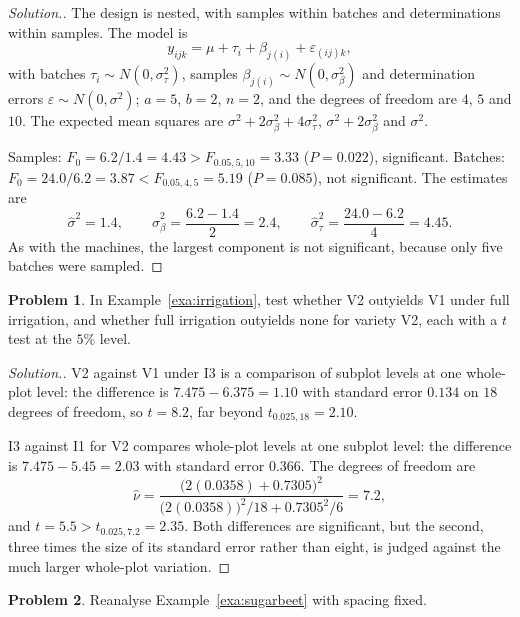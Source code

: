 \documentclass[11pt,a4paper]{article}
\numberwithin{equation}{section}
\theoremstyle{definition}
\newtheorem{problemx}{Problem}[subsection]
\newenvironment{problem}{\begin{problemx}}{\end{problemx}}
\newenvironment{solution}
  {\renewcommand{\qedsymbol}{}\begin{proof}[\textit{Solution}.]}
  {\end{proof}}
\begin{document}
\begin{solution}
The design is nested, with samples within batches and determinations within samples. The model is
\[
y_{ijk} = \mu + \tau_i + \beta_{j(i)} + \varepsilon_{(ij)k} ,
\]
with batches $\tau_i \sim N(0, \sigma^2_\tau)$, samples $\beta_{j(i)} \sim N(0, \sigma^2_\beta)$ and determination errors $\varepsilon \sim N(0, \sigma^2)$;
$a = 5$, $b = 2$, $n = 2$, and the degrees of freedom are $4$, $5$ and $10$. The expected mean squares are $\sigma^2 + 2\sigma^2_\beta + 4\sigma^2_\tau$, $\sigma^2 + 2\sigma^2_\beta$ and $\sigma^2$.

Samples: $F_0 = 6.2/1.4 = 4.43 > F_{0.05, 5, 10} = 3.33$ ($P = 0.022$), significant. Batches: $F_0 = 24.0/6.2 = 3.87 < F_{0.05, 4, 5} = 5.19$ ($P = 0.085$), not significant. The estimates are
\[
\hat\sigma^2 = 1.4 , \qquad \hat\sigma^2_\beta = \frac{6.2 - 1.4}2 = 2.4 , \qquad \hat\sigma^2_\tau = \frac{24.0 - 6.2}4 = 4.45 .
\]
As with the machines, the largest component is not significant, because only five batches were sampled.
\end{solution}

\begin{problem}
In Example~\ref{exa:irrigation}, test whether V2 outyields V1 under full irrigation, and whether full irrigation outyields none for variety V2, each with
a $t$ test at the $5\%$ level.
\end{problem}

\begin{solution}
V2 against V1 under I3 is a comparison of subplot levels at one whole-plot level: the difference is $7.475 - 6.375 = 1.10$ with standard error $0.134$ on $18$
degrees of freedom, so $t = 8.2$, far beyond $t_{0.025, 18} = 2.10$.

I3 against I1 for V2 compares whole-plot levels at one subplot level: the difference is $7.475 - 5.45 = 2.03$ with standard error $0.366$. The degrees of
freedom are
\[
\hat\nu = \frac{\bigl(2(0.0358) + 0.7305\bigr)^2}{\bigl(2(0.0358)\bigr)^2/18 + 0.7305^2/6} = 7.2 ,
\]
and $t = 5.5 > t_{0.025, 7.2} = 2.35$. Both differences are significant, but the second, three times the size of its standard error rather than eight, is
judged against the much larger whole-plot variation.
\end{solution}

\begin{problem}\label{prob:beet-fixed}
Reanalyse Example~\ref{exa:sugarbeet} with spacing fixed.
\end{problem}
\end{document}
